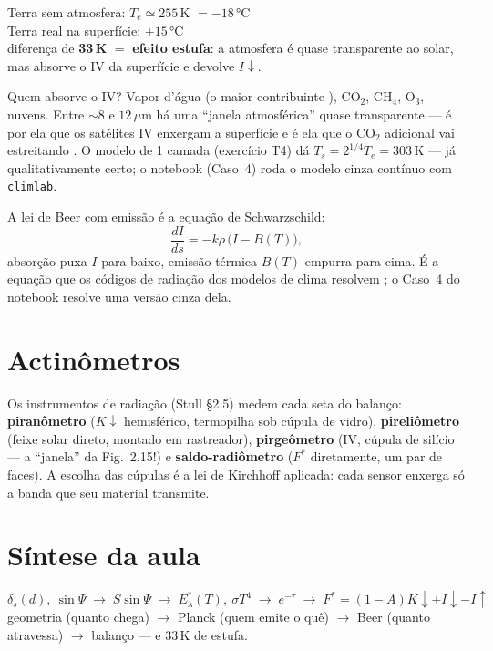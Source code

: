 \documentclass[11pt]{article}
\begin{document}
\begin{noquadro}
Terra sem atmosfera: $T_e \simeq 255$\,K $= -18\,°$C\\
Terra real na superfície: $+15\,°$C\\[2pt]
diferença de \textbf{33\,K} $=$ \textbf{efeito estufa}: a atmosfera é
quase transparente ao solar, mas absorve o IV da superfície e devolve
$I\!\downarrow$.
\end{noquadro}

Quem absorve o IV? Vapor d'água (o maior contribuinte
), CO$_2$, CH$_4$, O$_3$, nuvens. Entre
$\sim 8$ e $12\,\mu$m há uma ``janela atmosférica'' quase transparente —
é por ela que os satélites IV enxergam a superfície
 e é ela que o CO$_2$ adicional vai
estreitando . O modelo de 1 camada
(exercício T4) dá $T_s = 2^{1/4}T_e = 303$\,K — já qualitativamente certo;
o notebook (Caso~4) roda o modelo cinza contínuo com \texttt{climlab}.

\begin{formadif}
A lei de Beer com emissão é a equação de Schwarzschild:
\[ \frac{dI}{ds} = -k\rho\,\bigl(I - B(T)\bigr), \]
absorção puxa $I$ para baixo, emissão térmica $B(T)$ empurra para cima.
É a equação que os códigos de radiação dos modelos de clima resolvem
; o Caso~4 do notebook resolve uma versão
cinza dela.
\end{formadif}

\section{Actinômetros}

Os instrumentos de radiação (Stull \S2.5) medem cada seta do balanço:
\textbf{piranômetro} ($K\!\downarrow$ hemisférico, termopilha sob
cúpula de vidro), \textbf{pireliômetro} (feixe solar direto, montado
em rastreador), \textbf{pirgeômetro} (IV, cúpula de silício — a
``janela'' da Fig.~2.15!) e \textbf{saldo-radiômetro} ($F^*$
diretamente, um par de faces). A escolha das cúpulas é a lei de
Kirchhoff aplicada: cada sensor enxerga só a banda que seu material
transmite.

\section{Síntese da aula}

\begin{noquadro}
\[ \delta_s(d),\ \sin\Psi \;\to\; S\sin\Psi \;\to\;
   E^*_\lambda(T),\ \sigma T^4 \;\to\; e^{-\tau} \;\to\;
   F^* = (1-A)K\!\downarrow + I\!\downarrow - I\!\uparrow \]
geometria (quanto chega) $\to$ Planck (quem emite o quê) $\to$ Beer
(quanto atravessa) $\to$ balanço — e 33\,K de estufa.
\end{noquadro}
\end{document}
